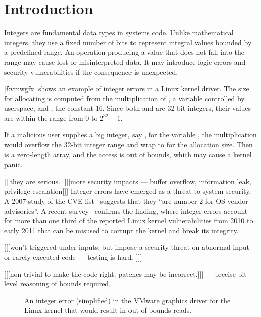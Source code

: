 \section{Introduction}
\label{s:intro}

Integers are fundamental data types in systems code.  Unlike
mathematical integers, they use a fixed number of bits to represent
integral values bounded by a predefined range.  An operation producing
a value that does not fall into the range may cause lost or
misinterpreted data.  It may introduce logic errors and security
vulnerabilities if the consequence is unexpected.

\autoref{f:vmwgfx} shows an example of integer errors in a Linux
kernel driver.  The size for allocating  is computed from
the multiplication of , a variable controlled
by userspace, and , the constant
$16$.  Since both  and  are 32-bit
integers, their values are within the range from 0 to $2^{32} - 1$.

If a malicious user supplies a big integer, say ,
for the variable , the multiplication would
overflow the 32-bit integer range and wrap to  for the allocation size.  Then  is a zero-length
array, and the access  is out of bounds, which may
cause a kernel panic.

[[[they are serious.]
[[[more security impacts --- buffer overflow, information leak,
privilege escalation]]]
Integer errors have emerged as a threat to system security.  A 2007
study of the CVE list~\cite{christey:vuln} suggests that they ``are
number 2 for OS vendor advisories''.  A recent survey~\cite{chen:kbugs}
confirms the finding, where integer errors account for more than
one third of the reported Linux kernel vulnerabilities from 2010
to early 2011 that can be misused to corrupt the kernel and break
its integrity.

[[[won't triggered under inputs, but impose a security threat
on abnormal input or rarely executed code --- testing is hard.
]]]

[[[non-trivial to make the code right. patches may be incorrect.]]]
--- precise bit-level reasoning of bounds required.

\begin{figure}

\caption{An integer error (simplified) in the VMware graphics driver
for the Linux kernel that would result in out-of-bounds reads.}
\label{f:vmwgfx}
\end{figure}
